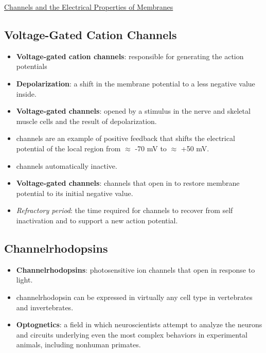 \documentclass[12pt,letterpaper]{article}
\begin{document}
\begin{secbox}{\hyperlink{11}{Channels and the Electrical Properties of Membranes}}
{    \hypertarget{11.3.7}{\subsection*{Voltage-Gated Cation Channels}}
    \begin{itemize}
        \item \textbf{Voltage-gated cation channels}: responsible for generating the action potentials
        \item \textbf{Depolarization}:  a shift in the membrane potential to a less negative value inside. 
        \item \textbf{Voltage-gated  channels}: opened by a stimulus in the nerve and skeletal muscle cells and the result of depolarization.
        \item {} channels are an example of positive feedback that shifts the electrical potential of the local region from $\approx$ -70 mV to $\approx$ +50 mV.
        \item {} channels automatically inactive. 
        \item \textbf{Voltage-gated  channels}: channels that open in to restore membrane potential to its initial negative value.
        \item \textit{Refractory period}: the time required for  channels to recover from self inactivation and to support a new action potential. 
    \end{itemize}
    
    \hypertarget{11.3.8}{\subsection*{Channelrhodopsins}}
    \begin{itemize}
        \item \textbf{Channelrhodopsins}: photosensitive ion channels that open in response to light.
        \item channelrhodopsin can be expressed in virtually any cell type in vertebrates and invertebrates.
        \item \textbf{Optognetics}: a field in which neuroscientists attempt to analyze the neurons and circuits underlying even the most complex behaviors in experimental animals, including nonhuman primates.
    \end{itemize}
    
}
\end{secbox}
\end{document}
